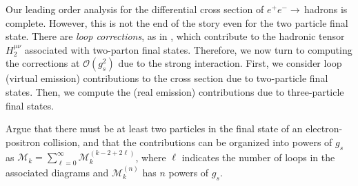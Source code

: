 


Our leading order analysis for the differential cross section of \(e^+ e^-\to\,\)hadrons is complete.
However, this is not the end of the story even for the two particle final state.
%
There are \textit{loop corrections}, as in , which contribute to the hadronic tensor \(H^{\mu\nu}_2\) associated with two-parton final states.
%
Therefore, we now turn to computing the corrections at \(\mathcal{O}(g_s^2)\) due to the strong interaction.
%
First, we consider loop (virtual emission) contributions to the cross section due to two-particle final states.
%
Then, we compute the (real emission) contributions due to three-particle final states.

\begin{exercise}{}
    Argue that there must be at least two particles in the final state of an electron-positron collision, and that the contributions can be organized into powers of \(g_s\) as \(\mathcal{M}_k = \sum_{\ell=0}^\infty \mathcal{M}_k^{(k-2+2\ell)}\), where \(\ell\) indicates the number of loops in the associated diagrams and \(\mathcal{M}_k^{(n)}\) has \(n\) powers of \(g_s\).
\end{exercise}



\begin{figure}[t!]
    \centering


    \caption{
    }

    \label{fig:amplitudes}
\end{figure}


